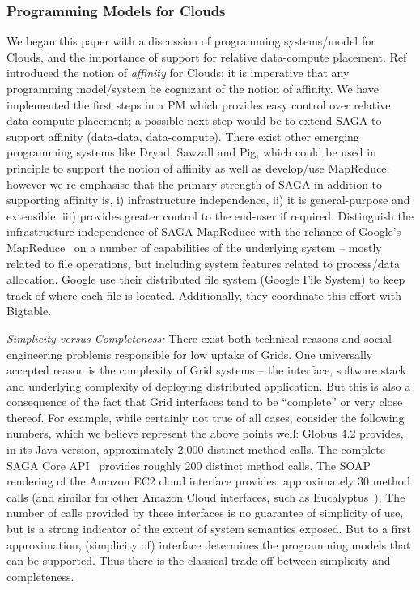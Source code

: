 \documentclass[3p,twocolumn]{elsarticle}
\newcommand{\sagamapreduce }{SAGA-MapReduce }
\begin{document}
\subsubsection*{Programming Models for Clouds} We began this paper
with a discussion of programming systems/model for Clouds, and the
importance of support for relative data-compute
placement. Ref~\cite{jha_ccpe09} introduced the notion of {\it
  affinity} for Clouds; it is imperative that any programming
model/system be cognizant of the notion of affinity. We have
implemented the first steps in a PM which provides easy control over
relative data-compute placement; a possible next step would be to
extend SAGA to support affinity (data-data, data-compute).  There
exist other emerging programming systems like Dryad, Sawzall and Pig,
which could be used in principle to support the notion of affinity as
well as develop/use MapReduce; however we re-emphasise that the
primary strength of SAGA in addition to supporting affinity is, i)
infrastructure independence, ii) it is general-purpose and extensible, iii)
provides greater control to the end-user if required.  Distinguish the
infrastructure independence of \sagamapreduce with the reliance of
Google's MapReduce~\cite{mapreduce-paper} on a number of capabilities
of the underlying system -- mostly related to file operations, but
including system features related to process/data
allocation.  %
Google use their distributed file system (Google File System) to keep
track of where each file is located.  Additionally, they coordinate
this effort with Bigtable.


{\it Simplicity versus Completeness:} There exist both technical
reasons and social engineering problems responsible for low uptake of
Grids. One universally accepted reason is the complexity of Grid
systems -- the interface, software stack and underlying complexity of
deploying distributed application. But this is also a consequence of
the fact that Grid interfaces tend to be ``complete'' or very close
thereof.  For example, while certainly not true of all cases, consider
the following numbers, which we believe represent the above points
well: Globus 4.2 provides, in its Java version,
approximately 2,000 distinct method calls.  The complete SAGA Core
API~\cite{saga-core} provides roughly 200 distinct method calls.  The
SOAP rendering of the Amazon EC2 cloud interface provides,
approximately 30 method calls (and similar for other Amazon Cloud
interfaces, such as Eucalyptus~\cite{eucalyptus}).  The number of
calls provided by these interfaces is no guarantee of simplicity of
use, but is a strong indicator of the extent of system semantics
exposed.  But to a first approximation, (simplicity of) interface
determines the programming models that can be supported. Thus there is
the classical trade-off between simplicity and completeness.
\end{document}
